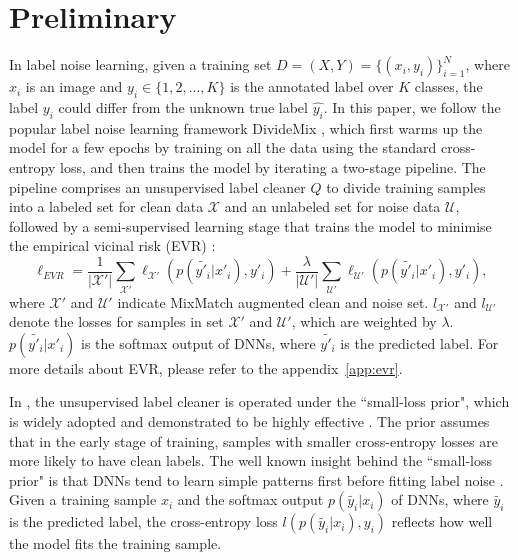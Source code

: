 \documentclass{article} \usepackage{iclr2023_conference,times}
\begin{document}
\section{Preliminary}\label{sec:preliminary}
In label noise learning, given a training set $D=(X, Y)=\{(x_i, y_i)\}_{i=1}^{N}$, where $x_i$ is an image and $y_i \in \{1,2,...,K\}$ is the annotated label over $K$ classes,  the label $y_i$ could differ from the unknown true label $\hat{y_i}$. 
In this paper, we follow the popular label noise learning framework DivideMix \citep{Li2020DivideMixLW}, which first warms up the model for a few epochs by training on all the data using the standard cross-entropy loss, and then trains the model by iterating a two-stage   pipeline. The pipeline comprises an unsupervised label cleaner $Q$ to divide training samples into a labeled set for clean data $\mathcal{X}$ and an unlabeled set for noise data $\mathcal{U}$, followed by a semi-supervised learning stage that trains the model to minimise the empirical vicinal risk (EVR) \citep{zhang2017mixup}:
\begin{equation} 
\ell_{EVR} = \frac{1}{|\mathcal{X'}|} \sum_{\mathcal{X'}} \ell_{\mathcal{X'}}(p(\tilde{y'_i}|x'_i), y'_i) + \frac{\lambda}{|\mathcal{U'}|} \sum_{\mathcal{U'}} \ell_{\mathcal{U'}}(p(\tilde{y'_i}|x'_i), y'_i),
\label{loss_EVR}
\end{equation}
where $\mathcal{X'}$ and $\mathcal{U'}$ indicate MixMatch \citep{berthelot2019mixmatch} augmented clean and noise set.  $l_{\mathcal{X'}}$ and $l_{\mathcal{U'}}$ denote the losses for samples in set $\mathcal{X'}$ and $\mathcal{U'}$, which are weighted by $\lambda$.  $p(\tilde{y'_i}|x'_i)$ is the softmax output of DNNs, where $\tilde{y'_i}$ is the predicted label. For more details about EVR, please refer to the appendix~\ref{app:evr}. 

In \citet{Li2020DivideMixLW}, the unsupervised label cleaner is operated under the ``small-loss prior", which is widely adopted and demonstrated to be highly effective \citep{han2020survey}.
 The prior assumes that in the early stage of training, samples with smaller cross-entropy losses are more likely to have clean labels. The well known insight behind the ``small-loss prior" is that DNNs tend to learn simple patterns first before fitting label noise \citep{arpit2017closer}. Given a training sample $x_i$ and the softmax output $p(\tilde{y_i}|x_i)$ of DNNs, where $\tilde{y_i}$ is the predicted label, the cross-entropy loss $l(p(\tilde{y_i}|x_i), y_i)$ reflects how well the model fits the training sample. 
\end{document}
